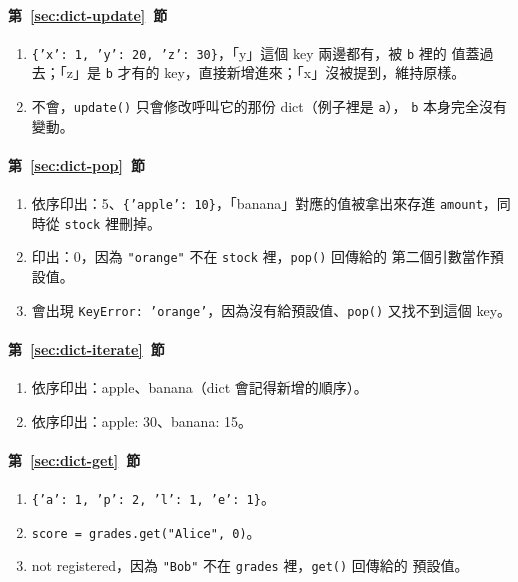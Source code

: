 \paragraph{第~\ref{sec:dict-update}~節}
\begin{enumerate}
\item \texttt{\{'x': 1, 'y': 20, 'z': 30\}}，「y」這個 key 兩邊都有，被 \texttt{b} 裡的
值蓋過去；「z」是 \texttt{b} 才有的 key，直接新增進來；「x」沒被提到，維持原樣。
\item 不會，\texttt{update()} 只會修改呼叫它的那份 dict（例子裡是 \texttt{a}），
\texttt{b} 本身完全沒有變動。
\end{enumerate}

\paragraph{第~\ref{sec:dict-pop}~節}
\begin{enumerate}
\item 依序印出：5、\texttt{\{'apple': 10\}}，「banana」對應的值被拿出來存進
\texttt{amount}，同時從 \texttt{stock} 裡刪掉。
\item 印出：0，因為 \texttt{"orange"} 不在 \texttt{stock} 裡，\texttt{pop()} 回傳給的
第二個引數當作預設值。
\item 會出現 \texttt{KeyError: 'orange'}，因為沒有給預設值、\texttt{pop()} 又找不到這個
key。
\end{enumerate}

\paragraph{第~\ref{sec:dict-iterate}~節}
\begin{enumerate}
\item 依序印出：apple、banana（dict 會記得新增的順序）。
\item 依序印出：apple: 30、banana: 15。
\end{enumerate}

\paragraph{第~\ref{sec:dict-get}~節}
\begin{enumerate}
\item \texttt{\{'a': 1, 'p': 2, 'l': 1, 'e': 1\}}。
\item \texttt{score = grades.get("Alice", 0)}。
\item not registered，因為 \texttt{"Bob"} 不在 \texttt{grades} 裡，\texttt{get()} 回傳給的
預設值。
\end{enumerate}

